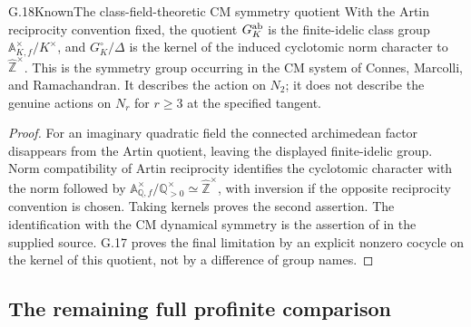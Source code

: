 \begin{statement}{G.18}{Known}{The class-field-theoretic CM symmetry quotient}
With the Artin reciprocity convention fixed, the quotient
$G_K^{\rm ab}$ is the finite-idelic class group
$\mathbb A_{K,f}^{\times}/K^{\times}$, and
$G_K^\circ/\Delta$ is the kernel of the induced cyclotomic
norm character to $\widehat{\mathbb Z}^{\times}$.
This is the symmetry group occurring in the CM system of
Connes, Marcolli, and Ramachandran. It describes the action
on $N_2$; it does not describe the genuine actions on
$N_r$ for $r\ge3$ at the specified tangent.
\end{statement}
\begin{proof}
For an imaginary quadratic field the connected archimedean
factor disappears from the Artin quotient, leaving the
displayed finite-idelic group. Norm compatibility of Artin
reciprocity identifies the cyclotomic character with the
norm followed by
$\mathbb A_{\mathbb Q,f}^{\times}/\mathbb Q_{>0}^{\times}
\simeq\widehat{\mathbb Z}^{\times}$, with inversion if the
opposite reciprocity convention is chosen. Taking kernels
proves the second assertion. The identification with the
CM dynamical symmetry is the assertion of
\citet[Theorem 5.1, source label \texttt{KMSCM}]{ConnesMarcolliRamachandran2005}
in the supplied source. G.17 proves the final limitation
by an explicit nonzero cocycle on the kernel of this
quotient, not by a difference of group names.
\end{proof}

\subsection{The remaining full profinite comparison}


